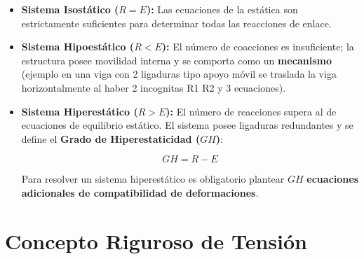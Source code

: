 \begin{itemize}

    \item \textbf{Sistema Isostático ($R = E$):} Las ecuaciones de la estática son estrictamente suficientes para determinar todas las reacciones de enlace.

    \item \textbf{Sistema Hipoestático ($R < E$):} El número de coacciones es insuficiente; la estructura posee movilidad interna y se comporta como un \textbf{mecanismo} (ejemplo en una viga con 2 ligaduras tipo apoyo móvil se traslada la viga horizontalmente al haber 2 incognitas R1 R2 y 3 ecuaciones).

    \item \textbf{Sistema Hiperestático ($R > E$):} El número de reacciones supera al de ecuaciones de equilibrio estático. El sistema posee ligaduras redundantes y se define el \textbf{Grado de Hiperestaticidad ($GH$)}:

          \begin{equation}

              GH = R - E

              \label{eq:grado_hiperestaticidad}

          \end{equation}

          Para resolver un sistema hiperestático es obligatorio plantear $GH$ \textbf{ecuaciones adicionales de compatibilidad de deformaciones}.

\end{itemize}



\section{Concepto Riguroso de Tensión}






